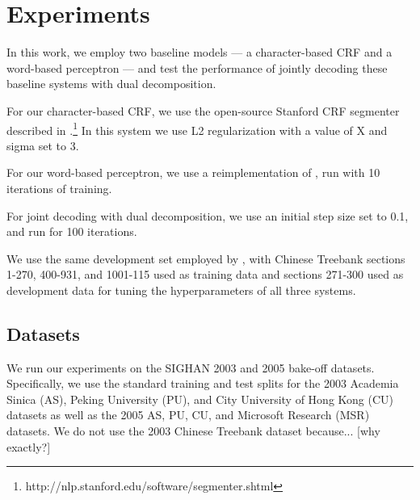 \section{Experiments}

In this work, we employ two baseline models --- a character-based CRF and a word-based perceptron --- and test the performance of jointly decoding these baseline systems with dual decomposition. 

For our character-based CRF, we use the open-source Stanford CRF segmenter described in \cite{Tseng:2005:SIGHAN}.\footnote{http://nlp.stanford.edu/software/segmenter.shtml} In this system we use L2 regularization with a value of X %
and sigma set to 3.

For our word-based perceptron, we use a reimplementation of \cite{Zhang:2007:ACL}, run with 10 iterations of training.

For joint decoding with dual decomposition, we use an initial step size set to 0.1, and run for 100 iterations.

We use the same development set employed by \cite{Zhang:2007:ACL}, with Chinese Treebank sections 1-270, 400-931, and 1001-115 used as training data and sections 271-300 used as development data for tuning the hyperparameters of all three systems.

\subsection{Datasets}
We run our experiments on the SIGHAN 2003 \cite{Sproat:2003:SIGHAN} and 2005 \cite{Emerson:2005:SIGHAN} bake-off datasets. Specifically, we use the standard training and test splits for the 2003 Academia Sinica (AS), Peking University (PU), and City University of Hong Kong (CU) datasets as well as the 2005 AS, PU, CU, and Microsoft Research (MSR) datasets. We do not use the 2003 Chinese Treebank dataset because... [why exactly?]




